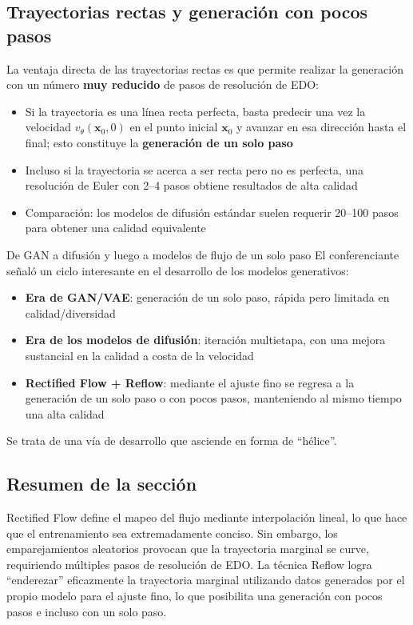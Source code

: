 \subsection{Trayectorias rectas y generación con pocos pasos}

La ventaja directa de las trayectorias rectas es que permite realizar la generación con un número \textbf{muy reducido} de pasos de resolución de EDO:

\begin{itemize}
    \item Si la trayectoria es una línea recta perfecta, basta predecir una vez la velocidad $v_\theta(\mathbf{x}_0, 0)$ en el punto inicial $\mathbf{x}_0$ y avanzar en esa dirección hasta el final; esto constituye la \textbf{generación de un solo paso}
    \item Incluso si la trayectoria se acerca a ser recta pero no es perfecta, una resolución de Euler con 2--4 pasos obtiene resultados de alta calidad
    \item Comparación: los modelos de difusión estándar suelen requerir 20--100 pasos para obtener una calidad equivalente
\end{itemize}

\begin{knowledgebox}{De GAN a difusión y luego a modelos de flujo de un solo paso}
El conferenciante señaló un ciclo interesante en el desarrollo de los modelos generativos:
\begin{itemize}
    \item \textbf{Era de GAN/VAE}: generación de un solo paso, rápida pero limitada en calidad/diversidad
    \item \textbf{Era de los modelos de difusión}: iteración multietapa, con una mejora sustancial en la calidad a costa de la velocidad
    \item \textbf{Rectified Flow + Reflow}: mediante el ajuste fino se regresa a la generación de un solo paso o con pocos pasos, manteniendo al mismo tiempo una alta calidad
\end{itemize}
Se trata de una vía de desarrollo que asciende en forma de ``hélice''.
\end{knowledgebox}

\subsection{Resumen de la sección}

Rectified Flow define el mapeo del flujo mediante interpolación lineal, lo que hace que el entrenamiento sea extremadamente conciso. Sin embargo, los emparejamientos aleatorios provocan que la trayectoria marginal se curve, requiriendo múltiples pasos de resolución de EDO. La técnica Reflow logra ``enderezar'' eficazmente la trayectoria marginal utilizando datos generados por el propio modelo para el ajuste fino, lo que posibilita una generación con pocos pasos e incluso con un solo paso.
